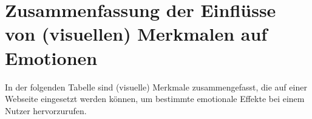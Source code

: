 \documentclass[./dokumentation.tex]{subfiles}
\begin{document}
\section{Zusammenfassung der Einflüsse von (visuellen) Merkmalen auf Emotionen}
In der folgenden Tabelle sind (visuelle) Merkmale zusammengefasst, die auf einer Webseite eingesetzt werden können, um bestimmte emotionale Effekte bei einem Nutzer hervorzurufen. 
\end{document}
